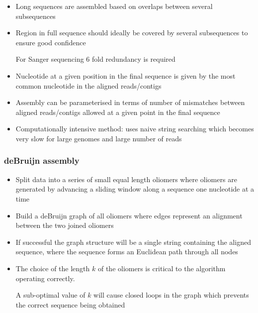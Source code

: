 \documentclass[a4paper]{article}
\begin{document}
\begin{itemize}
  \item
    Long sequences are assembled based on overlaps between several subsequences

  \item
    Region in full sequence should ideally be covered by several subsequences
    to ensure good confidence

    For Sanger sequencing 6 fold redundancy is required

  \item
    Nucleotide at a given position in the final sequence is given by the most
    common nucleotide in the aligned reads/contigs

  \item
    Assembly can be parameterised in terms of number of mismatches between
    aligned reads/contigs allowed at a given point in the final sequence

  \item
    Computationally intensive method: uses naive string searching which becomes
    very slow for large genomes and large number of reads

\end{itemize}

\subsubsection{deBruijn assembly}

\begin{itemize}
  \item
    Split data into a series of small equal length oliomers where oliomers are
    generated by advancing a sliding window along a sequence one nucleotide at a
    time

  \item
    Build a deBruijn graph of all oliomers where edges represent an alignment
    between the two joined oliomers

  \item
    If successful the graph structure will be a single string containing the
    aligned sequence, where the sequence forms an Euclidean path through all
    nodes

  \item
    The choice of the length $k$ of the oliomers is critical to the algorithm
    operating correctly.

    A sub-optimal value of $k$ will cause closed loops in the graph which
    prevents the correct sequence being obtained

\end{itemize}
\end{document}
